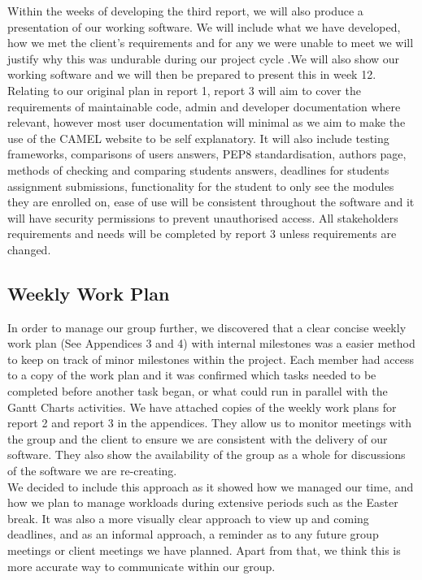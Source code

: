 Within the weeks of developing the third report, we will also produce a presentation of our working software. We will include what we have developed, how we met the client's requirements and for any we were unable to meet we will justify why this was undurable during our project cycle .We will also show our working software and we will then be prepared to present this in week 12. \\

Relating to our original plan in report 1, report 3 will aim to cover the requirements of maintainable code, admin and developer documentation where relevant, however most user documentation will minimal as we aim to make the use of the CAMEL website to be self explanatory. It will also include testing frameworks, comparisons of users answers, PEP8 standardisation, authors page, methods of checking and comparing students answers, deadlines for students assignment submissions, functionality for the student to only see the modules they are enrolled on, ease of use will be consistent throughout the software and it will have security permissions to prevent unauthorised access. All stakeholders requirements and needs will be completed by report 3 unless requirements are changed.\\


\subsection*{Weekly Work Plan}

In order to manage our group further, we discovered that a clear concise weekly work plan (See Appendices 3 and 4) with internal milestones was a easier method to keep on track of minor milestones within the project. Each member had access to a copy of the work plan and it was confirmed which tasks needed to be completed before another task began, or what could run in parallel with the Gantt Charts activities. We have attached copies of the weekly work plans for report 2 and report 3 in the appendices. They allow us to monitor meetings with the group and the client to ensure we are consistent with the delivery of our software. They also show the availability of the group as a whole for discussions of the software we are re-creating. \\

We decided to include this approach as it showed how we managed our time, and how we plan to manage workloads during extensive periods such as the Easter break. It was also a more visually clear approach to view up and coming deadlines, and as an informal approach, a reminder as to any future  group meetings or client meetings we have planned. Apart from that, we think this is more accurate way  to communicate within our group. \\

